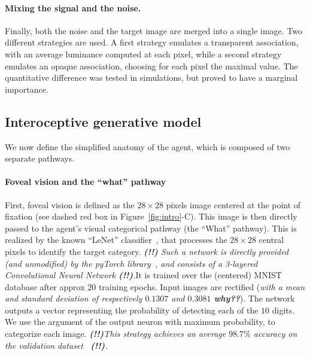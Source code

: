 \paragraph{Mixing the signal and the noise. } Finally, both the noise and the target image are merged into a single image. Two different strategies are used. A first strategy emulates a transparent association, with an average luminance computed at each pixel, while a second strategy emulates an opaque association, choosing for each pixel the maximal value. The quantitative difference was tested in simulations, but proved to have a marginal importance.
%
\subsection{Interoceptive generative model}
%
We  now define the simplified anatomy of the agent, which is composed of two separate pathways.

\paragraph{Foveal vision and the ``what'' pathway}
First, foveal vision is defined as the $28\times 28$ pixels image centered at the point of fixation (see dashed red box in Figure~\ref{fig:intro}-C). This image is then directly passed to the agent's visual categorical pathway (the ``What'' pathway). This is realized by the known ``LeNet'' classifier~\citep{Lecun1998}, that processes the $28 \times 28$ central pixels to identify the target category. \ICANN \emph{{\bf (!!)} Such a network is directly provided (and unmodified) by the pyTorch library~\citep{Paszke17}, and consists of a 3-layered Convolutional Neural Network {\bf (!!)}.}\fi It is trained over the (centered) MNIST database after approx $20$ training epochs. \ICANN
\else
Input images are rectified (\emph{with a mean and standard deviation of respectively $0.1307$ and $0.3081$ {\bf why??}}). \fi The network outputs a vector representing the probability of detecting each of the $10$ digits. We use the argument of the output neuron with maximum probability, to categorize each image.  \ICANN \emph{{\bf (!!)}This strategy achieves an average $98.7\%$ accuracy on the validation dataset~\citep{Lecun1998} {\bf (!!)}.} \fi%

